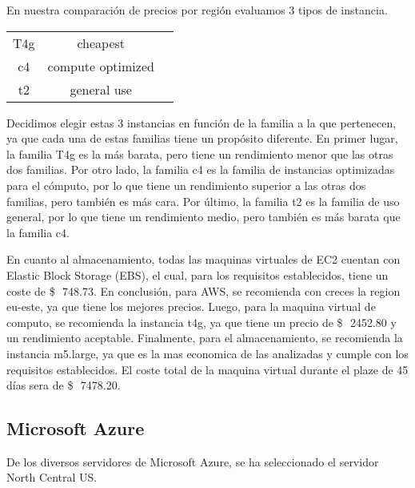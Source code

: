 \documentclass{article}
\newcommand{\usd}[1]{\SI{#1}[\$\ensuremath{\,}]{}}
\begin{document}
    En nuestra comparación de precios por región evaluamos 3 tipos de instancia.
      \begin{table}[!htp]\centering
        \begin{tabular}{|c|c|c|}

          T4g	& cheapest          \\
          c4	& compute optimized \\
          t2	& general use       \\
          
        \end{tabular}
      \end{table}
    Decidimos elegir estas 3 instancias en función de la familia a la que pertenecen, ya que cada una de estas familias tiene un propósito diferente.
    En primer lugar, la familia T4g es la más barata, pero tiene un rendimiento menor que las otras dos familias. Por otro lado, la familia c4 es la familia de instancias optimizadas para el cómputo, por lo que tiene un rendimiento superior a las otras dos familias, pero también es más cara. Por último, la familia t2 es la familia de uso general, por lo que tiene un rendimiento medio, pero también es más barata que la familia c4.

    En cuanto al almacenamiento, todas las maquinas virtuales de EC2 cuentan con Elastic Block Storage (EBS), el cual, para los requisitos establecidos, tiene un coste de \usd{748.73}.
    En conclusión, para AWS, se recomienda con creces la region eu-este, ya que tiene los mejores precios. Luego, para la maquina virtual de computo, se recomienda la instancia t4g, ya que tiene un precio de \usd{2452.80} y un rendimiento aceptable. Finalmente, para el almacenamiento, se recomienda la instancia m5.large, ya que es la mas economica de las analizadas y cumple con los requisitos establecidos. El coste total de la maquina virtual durante el plaze de 45 días sera de \usd{7478.20}.

  \subsection{Microsoft Azure}

  De los diversos servidores de Microsoft Azure, se ha seleccionado el servidor North Central US.
\end{document}
